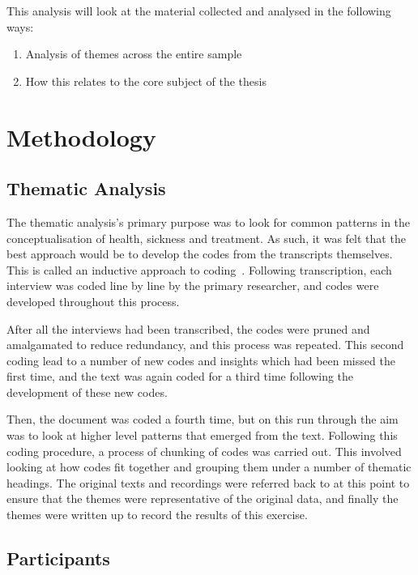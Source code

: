 This analysis will look at the material collected and analysed in the following ways:

\begin{enumerate}
\item Analysis of themes across the entire sample 
\item How this relates to the core subject of the thesis
\end{enumerate}

\section{Methodology}



\subsection{Thematic Analysis}

The thematic analysis's primary purpose was to look for common patterns in the conceptualisation of health, sickness and treatment. As such, it was felt that the best approach would be to develop the codes from the transcripts themselves. 
This is called an inductive approach to coding~\cite{haberman1979analysis}. Following transcription, each interview was coded line by line by the primary researcher, and codes were developed throughout this process.

After all the interviews had been transcribed, the codes were pruned and amalgamated to reduce redundancy, and this process was repeated. This second coding lead to a number of new codes and insights which had been missed the first time, and the text was again coded for a third time following the development of these new codes.

Then, the document was coded a fourth time, but on this run through the aim was to look at higher level patterns that emerged from the text. Following this coding procedure, a process of chunking of codes was carried out. This involved looking at how codes fit together and grouping them under a number of thematic headings. The original texts and recordings were referred back to at this point to ensure that the themes were representative of the original data, and finally the themes were written up to record the results of this exercise.



\subsection{Participants}
\label{sec:participants}



